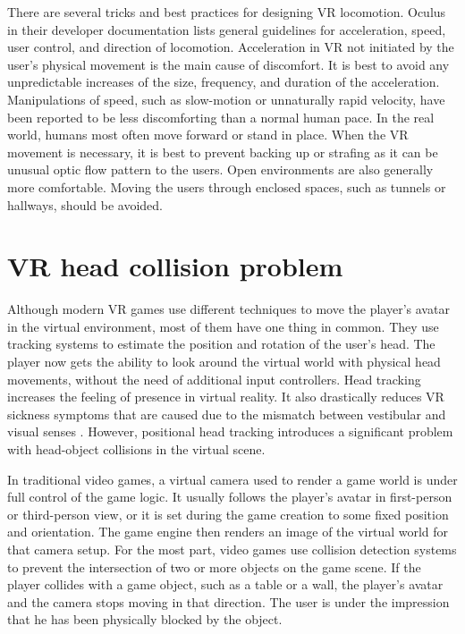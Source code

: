 There are several tricks and best practices for designing VR locomotion. Oculus in their developer documentation \cite{OCULUSDOC} lists general guidelines for acceleration, speed, user control, and direction of locomotion. Acceleration in VR not initiated by the user's physical movement is the main cause of discomfort. It is best to avoid any unpredictable increases of the size, frequency, and duration of the acceleration. Manipulations of speed, such as slow-motion or unnaturally rapid velocity, have been reported to be less discomforting than a normal human pace. In the real world, humans most often move forward or stand in place. When the VR movement is necessary, it is best to prevent backing up or strafing as it can be unusual optic flow pattern to the users. Open environments are also generally more comfortable. Moving the users through enclosed spaces, such as tunnels or hallways, should be avoided.

\section{VR head collision problem}

Although modern VR games use different techniques to move the player's avatar in the virtual environment, most of them have one thing in common. They use tracking systems to estimate the position and rotation of the user's head. The player now gets the ability to look around the virtual world with physical head movements, without the need of additional input controllers. Head tracking increases the feeling of presence in virtual reality. It also drastically reduces VR sickness symptoms that are caused due to the mismatch between vestibular and visual senses \cite{HEADTRACKINGSYMPTOMS}. However, positional head tracking introduces a significant problem with head-object collisions in the virtual scene.

In traditional video games, a virtual camera used to render a game world is under full control of the game logic. It usually follows the player's avatar in first-person or third-person view, or it is set during the game creation to some fixed position and orientation. The game engine then renders an image of the virtual world for that camera setup. For the most part, video games use collision detection systems to prevent the intersection of two or more objects on the game scene. If the player collides with a game object, such as a table or a wall, the player's avatar and the camera stops moving in that direction. The user is under the impression that he has been physically blocked by the object. 

